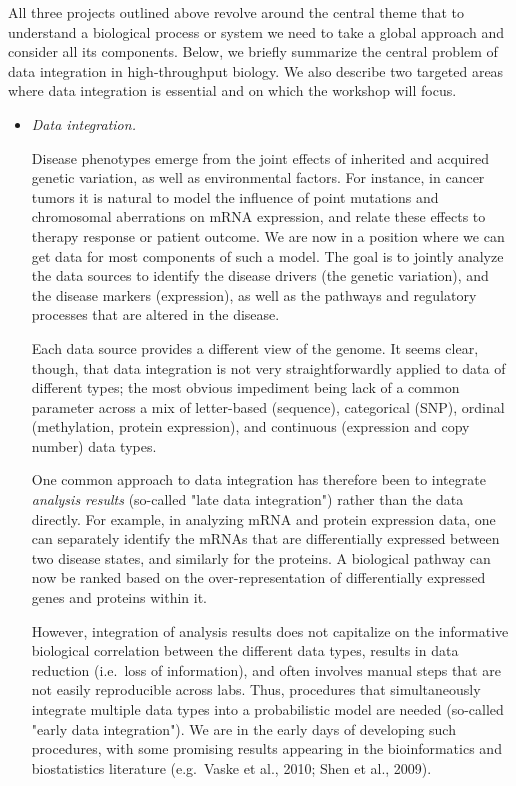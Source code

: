 \documentclass[12pt]{amsart}
\begin{document}
All three projects outlined above revolve around the central theme
that to understand a biological process or system we need to take a
global approach and consider all its components.  Below, we briefly
summarize the central problem of data integration in high-throughput
biology. We also describe two targeted areas where data integration
is essential and on which the workshop will focus.

\begin{itemize}

\item \textit{Data integration.}
  
  Disease phenotypes emerge from the joint effects of inherited and
  acquired genetic variation, as well as environmental factors. For
  instance, in cancer tumors it is natural to model the influence of
  point mutations and chromosomal aberrations on mRNA expression, and
  relate these effects to therapy response or patient outcome. We are
  now in a position where we can get data for most components of such
  a model. The goal is to jointly analyze the data sources to identify
  the disease drivers (the genetic variation), and the disease markers
  (expression), as well as the pathways and regulatory processes that
  are altered in the disease.

  Each data source provides a different view of the genome. It seems
  clear, though, that data integration is not very straightforwardly
  applied to data of different types; the most obvious impediment
  being lack of a common parameter across a mix of letter-based
  (sequence), categorical (SNP), ordinal (methylation, protein
  expression), and continuous (expression and copy number) data types.

  One common approach to data integration has therefore been to
  integrate {\em analysis results} (so-called "late data integration")
  rather than the data directly. For example, in analyzing mRNA and
  protein expression data, one can separately identify the mRNAs that
  are differentially expressed between two disease states, and
  similarly for the proteins. A biological pathway can now be ranked
  based on the over-representation of differentially expressed genes
  and proteins within it.

  However, integration of analysis results does not capitalize on the
  informative biological correlation between the different data types,
  results in data reduction (i.e.\ loss of information), and often
  involves manual steps that are not easily reproducible across
  labs. Thus, procedures that simultaneously integrate multiple data
  types into a probabilistic model are needed (so-called "early data
  integration").  We are in the early days of developing such
  procedures, with some promising results appearing in the
  bioinformatics and biostatistics literature (e.g.\ Vaske et al.,
  2010; Shen et al., 2009).


\end{itemize}
\end{document}
